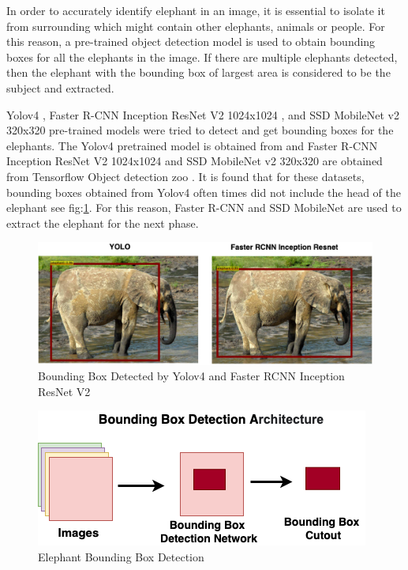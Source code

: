 \documentclass[10pt,twocolumn,letterpaper]{article}
\begin{document}
In order to accurately identify elephant in an image, it is essential to isolate it from surrounding which might contain other elephants, animals or people. For this reason, a pre-trained object detection model is used to obtain bounding boxes for all the elephants in the image. If there are multiple elephants detected, then the elephant with the bounding box of largest area is considered to be the subject and extracted.

Yolov4 \cite{yolov4}, Faster R-CNN Inception ResNet V2 1024x1024 \cite{fasterrcnn}, and SSD MobileNet v2 320x320 \cite{ssdnet} pre-trained models were tried to detect and get bounding boxes for the elephants. The Yolov4 pretrained model is obtained from \cite{tf2yolov4} and Faster R-CNN Inception ResNet V2 1024x1024 and SSD MobileNet v2 320x320 are obtained from Tensorflow Object detection zoo \cite{tensorflowzoo}. It is found that for these datasets, bounding boxes obtained from Yolov4 often times did not include the head of the elephant see fig:\ref{fig:boundingbox_comparison}. For this reason, Faster R-CNN and SSD MobileNet are used to extract the elephant for the next phase.

\begin{figure}[t]
  \centering
  \includegraphics[scale=0.2]{Bounding_box}
   \caption{Bounding Box Detected by Yolov4 and Faster RCNN Inception ResNet V2}
   \label{fig:boundingbox_comparison}
\end{figure}

\begin{figure}[t]
  \centering
  \includegraphics[scale=0.35]{boundingbox_network}
   \caption{Elephant Bounding Box Detection}
   \label{fig:boundingbox_network}
\end{figure}
\end{document}
